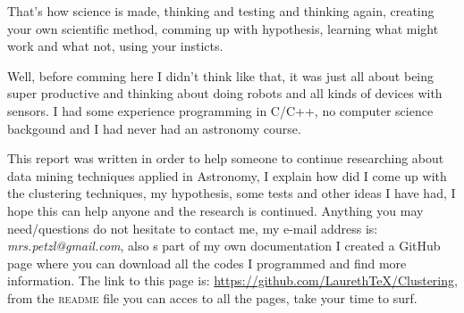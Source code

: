 That's how science is made, thinking and testing and thinking again, creating your own scientific method, comming up with hypothesis, learning what might work and what not, using your insticts.

Well, before comming here I didn't think like that, it was just all about being super productive and thinking about doing robots and all kinds of devices with sensors. I had some experience programming in C/C++, no computer science backgound and I had never had an astronomy course.

This report was written in order to help someone to continue researching about data mining techniques applied in Astronomy, I explain how did I come up with the clustering techniques, my hypothesis, some tests and other ideas I have had, I hope this can help anyone and the research is continued. Anything you may need/questions do not hesitate to contact me, my e-mail address is: \emph{mrs.petzl@gmail.com}, also s part of my own documentation I created a GitHub page where you can download all the codes I programmed and find more information. The link to this page is: \url{https://github.com/LaurethTeX/Clustering}, from the \textsc{readme} file you can acces to all the pages, take your time to surf.

